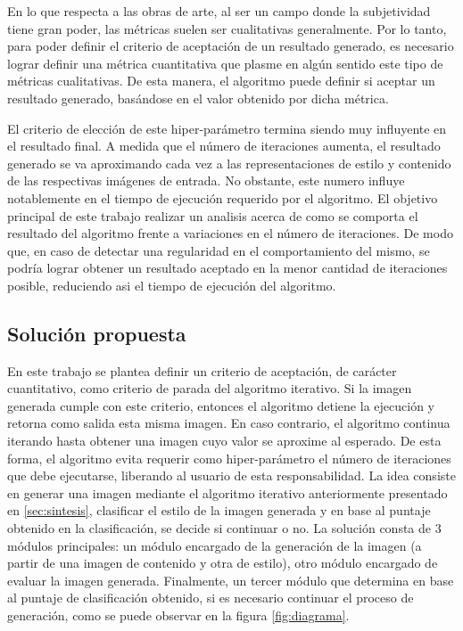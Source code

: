 \documentclass[a4paper,11pt,spanish]{book}
\begin{document}
      En lo que respecta a las obras de arte, al ser un campo donde la subjetividad tiene gran poder, las métricas suelen ser cualitativas generalmente. 
      Por lo tanto, para poder definir el criterio de aceptación de un resultado generado, es necesario lograr definir una métrica cuantitativa que plasme en algún sentido este tipo de 
      métricas cualitativas. De esta manera, el algoritmo puede definir si aceptar un resultado generado, basándose en el valor obtenido por dicha métrica.
      
      El criterio de elección de este hiper-parámetro termina siendo muy influyente en el resultado final. A medida que el número de iteraciones
      aumenta, el resultado generado se va aproximando cada vez a las representaciones de estilo y contenido de las respectivas imágenes de entrada. 
      No obstante, este numero influye notablemente en el tiempo de ejecución requerido por el algoritmo. 
      El objetivo principal de este trabajo realizar un analisis acerca de como se comporta el resultado del algoritmo frente a variaciones en el número de iteraciones. 
      De modo que, en caso de detectar una regularidad en el comportamiento del mismo, se podría lograr obtener un resultado aceptado en la menor cantidad de iteraciones 
      posible, reduciendo asi el tiempo de ejecución del algoritmo.

    \subsection{Solución propuesta} \label{sec:solucion}
      En este trabajo se plantea definir un criterio de aceptación, de carácter cuantitativo, como criterio de parada del algoritmo iterativo. 
      Si la imagen generada cumple con este criterio, entonces el algoritmo detiene la ejecución y retorna como salida esta misma imagen. 
      En caso contrario, el algoritmo continua iterando hasta obtener una imagen cuyo valor se aproxime al esperado.
      De esta forma, el algoritmo evita requerir como hiper-parámetro el número de iteraciones que debe ejecutarse, liberando al usuario de esta responsabilidad.
      La idea consiste en generar una imagen mediante el algoritmo iterativo anteriormente presentado en \ref{sec:sintesis}, clasificar el estilo de la imagen 
      generada y en base al puntaje obtenido en la clasificación, se decide si continuar o no.
      La solución consta de 3 módulos principales: un módulo encargado de la generación de la imagen (a partir de una imagen de contenido y otra de estilo), otro módulo 
      encargado de evaluar la imagen generada. Finalmente, un tercer módulo que determina en base al puntaje de clasificación obtenido, si es necesario continuar el 
      proceso de generación, como se puede observar en la figura \ref{fig:diagrama}.
\end{document}

